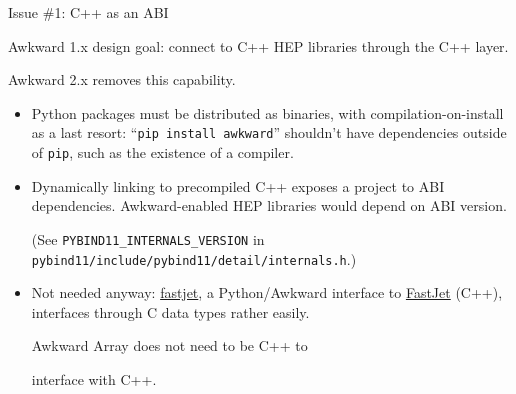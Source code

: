\documentclass[aspectratio=169]{beamer}
\begin{document}
\begin{frame}{Issue \#1: C++ as an ABI}
\large

\vspace{0.5 cm}
Awkward 1.x design goal: connect to C++ HEP libraries through the C++ layer.

\vspace{0.25 cm}
Awkward 2.x removes this capability.

\vspace{0.25 cm}
\begin{itemize}\setlength{\itemsep}{0.25 cm}
\item<2-> Python packages must be distributed as binaries, with compilation-on-install as a last resort: ``\texttt{pip install awkward}'' shouldn't have dependencies outside of \texttt{pip}, such as the existence of a compiler.

\item<3-> Dynamically linking to precompiled C++ exposes a project to ABI dependencies. Awkward-enabled HEP libraries would depend on ABI version.

{\scriptsize (See \texttt{PYBIND11_INTERNALS_VERSION} in \texttt{pybind11/include/pybind11/detail/internals.h}.)}

\item<4-> Not needed anyway: \textcolor{blue}{\href{https://github.com/scikit-hep/fastjet}{fastjet}}, a Python/Awkward interface to \textcolor{blue}{\href{http://fastjet.fr/}{FastJet}} (C++), interfaces through C data types rather easily.

\vspace{0.25 cm}
Awkward Array does not need to be C++ to

interface with C++.
\end{itemize}

\vspace{-1.65 cm}
\hfill {}

\vspace{-0.15 cm}
\hfill {}

\end{frame}
\end{document}

